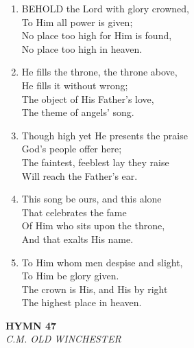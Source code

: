 \documentclass[11pt,a4paper]{article}
\begin{document}
\begin{enumerate}
    \item BEHOLD the Lord with glory crowned, \\
        To Him all power is given; \\
        No place too high for Him is found, \\
        No place too high in heaven.

    \item He fills the throne, the throne above, \\
        He fills it without wrong; \\
        The object of His Father's love, \\
        The theme of angels' song.

    \item Though high yet He presents the praise \\
        God's people offer here; \\
        The faintest, feeblest lay they raise \\
        Will reach the Father's ear.

    \item This song be ours, and this alone \\
        That celebrates the fame \\
        Of Him who sits upon the throne, \\
        And that exalts His name.

    \item To Him whom men despise and slight, \\
        To Him be glory given. \\
        The crown is His, and His by right \\
        The highest place in heaven.

\end{enumerate}

\newpage
\begin{center}
    {\Large \textbf{HYMN 47}}
    \\
    \textit{C.M. OLD WINCHESTER}
\end{center}
\vspace{1em}
\end{document}
